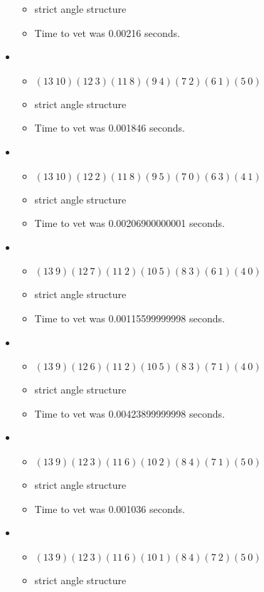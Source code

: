 \documentclass{article}
\begin{document}
\begin{itemize}
\begin{itemize}
      \item strict angle structure
      \item Time to vet was 0.00216 seconds.
\end{itemize}
\item \begin{itemize}
      \item $(13\ 10)(12\ 3)(11\ 8)(9\ 4)(7\ 2)(6\ 1)(5\ 0)$
      \item strict angle structure
      \item Time to vet was 0.001846 seconds.
\end{itemize}
\item \begin{itemize}
      \item $(13\ 10)(12\ 2)(11\ 8)(9\ 5)(7\ 0)(6\ 3)(4\ 1)$
      \item strict angle structure
      \item Time to vet was 0.00206900000001 seconds.
\end{itemize}
\item \begin{itemize}
      \item $(13\ 9)(12\ 7)(11\ 2)(10\ 5)(8\ 3)(6\ 1)(4\ 0)$
      \item strict angle structure
      \item Time to vet was 0.00115599999998 seconds.
\end{itemize}
\item \begin{itemize}
      \item $(13\ 9)(12\ 6)(11\ 2)(10\ 5)(8\ 3)(7\ 1)(4\ 0)$
      \item strict angle structure
      \item Time to vet was 0.00423899999998 seconds.
\end{itemize}
\item \begin{itemize}
      \item $(13\ 9)(12\ 3)(11\ 6)(10\ 2)(8\ 4)(7\ 1)(5\ 0)$
      \item strict angle structure
      \item Time to vet was 0.001036 seconds.
\end{itemize}
\item \begin{itemize}
      \item $(13\ 9)(12\ 3)(11\ 6)(10\ 1)(8\ 4)(7\ 2)(5\ 0)$
      \item strict angle structure

\end{itemize}
\end{itemize}
\end{document}
